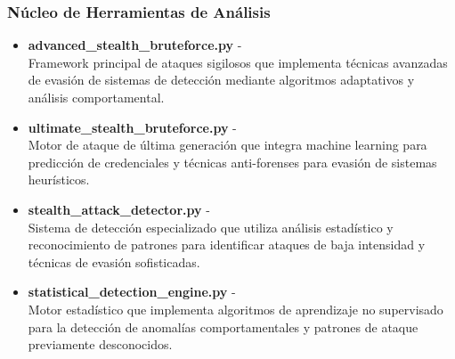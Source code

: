 \subsubsection*{Núcleo de Herramientas de Análisis}
\begin{itemize}
    \item \textbf{advanced\_stealth\_bruteforce.py} -  \\
    Framework principal de ataques sigilosos que implementa técnicas avanzadas de evasión de sistemas de detección mediante algoritmos adaptativos y análisis comportamental.
    
    \item \textbf{ultimate\_stealth\_bruteforce.py} -  \\
    Motor de ataque de última generación que integra machine learning para predicción de credenciales y técnicas anti-forenses para evasión de sistemas heurísticos.
    
    \item \textbf{stealth\_attack\_detector.py} -  \\
    Sistema de detección especializado que utiliza análisis estadístico y reconocimiento de patrones para identificar ataques de baja intensidad y técnicas de evasión sofisticadas.
    
    \item \textbf{statistical\_detection\_engine.py} -  \\
    Motor estadístico que implementa algoritmos de aprendizaje no supervisado para la detección de anomalías comportamentales y patrones de ataque previamente desconocidos.
\end{itemize}

